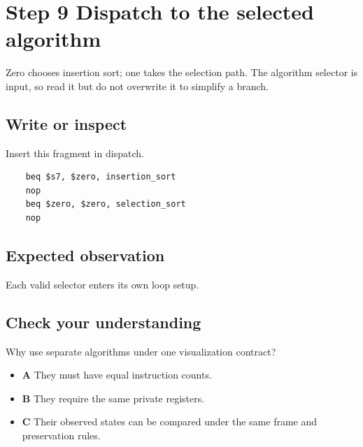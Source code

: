 \section{Step 9 Dispatch to the selected
  algorithm}\label{009-sorting-visualizer-s09-step-9-dispatch-to-the-selected-algorithm}

Zero chooses insertion sort; one takes the selection path. The algorithm
selector is input, so read it but do not overwrite it to simplify a
branch.

\subsection{Write or
  inspect}\label{009-sorting-visualizer-s09-write-or-inspect}

Insert this fragment in dispatch.

\begin{verbatim}
    beq $s7, $zero, insertion_sort
    nop
    beq $zero, $zero, selection_sort
    nop
\end{verbatim}

\subsection{Expected
  observation}\label{009-sorting-visualizer-s09-expected-observation}

Each valid selector enters its own loop setup.

\subsection{Check your
  understanding}\label{009-sorting-visualizer-s09-check-your-understanding}

Why use separate algorithms under one visualization contract?

\begin{itemize}
  \tightlist
  \item
        \textbf{A} They must have equal instruction counts.
  \item
        \textbf{B} They require the same private registers.
  \item
        \textbf{C} Their observed states can be compared under the same frame
        and preservation rules.
\end{itemize}
